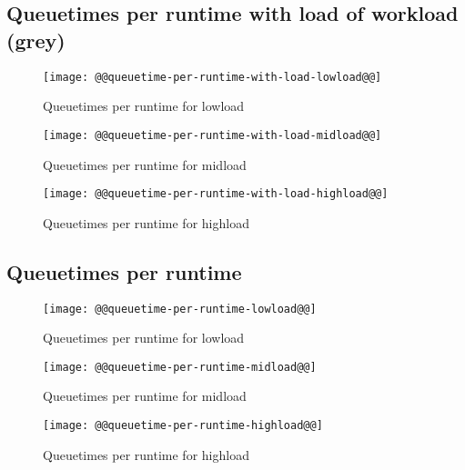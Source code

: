 \documentclass[11pt]{article}
\begin{document}
\newpage
\subsection{Queuetimes per runtime with load of workload (grey)}
\begin{figure}[htbp]
  \begin{center}
    \texttt{[image: @@queuetime-per-runtime-with-load-lowload@@]}
    \caption{Queuetimes per runtime for lowload}
    \label{fig:queuetime-per-runtime-with-lowload}
  \end{center}
\end{figure}
\begin{figure}[htbp]
  \begin{center}
    \texttt{[image: @@queuetime-per-runtime-with-load-midload@@]}
    \caption{Queuetimes per runtime for midload}
    \label{fig:queuetime-per-runtime-with-midload}
  \end{center}
\end{figure}
\begin{figure}[htbp]
  \begin{center}
    \texttt{[image: @@queuetime-per-runtime-with-load-highload@@]}
    \caption{Queuetimes per runtime for highload}
    \label{fig:queuetime-per-runtime-with-highload}
  \end{center}
\end{figure}

\newpage
\subsection{Queuetimes per runtime}
\begin{figure}[htbp]
  \begin{center}
    \texttt{[image: @@queuetime-per-runtime-lowload@@]}
    \caption{Queuetimes per runtime for lowload}
    \label{fig:queuetime-per-runtime-lowload}
  \end{center}
\end{figure}
\begin{figure}[htbp]
  \begin{center}
    \texttt{[image: @@queuetime-per-runtime-midload@@]}
    \caption{Queuetimes per runtime for midload}
    \label{fig:queuetime-per-runtime-midload}
  \end{center}
\end{figure}
\begin{figure}[htbp]
  \begin{center}
    \texttt{[image: @@queuetime-per-runtime-highload@@]}
    \caption{Queuetimes per runtime for highload}
    \label{fig:queuetime-per-runtime-highload}
  \end{center}
\end{figure}
\end{document}
